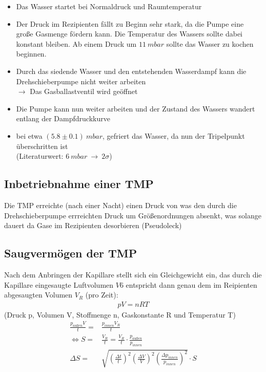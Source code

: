 \documentclass[12pt, a4paper]{scrartcl}
\begin{document}
        \begin{itemize}
            \item Das Wasser startet bei Normaldruck und Raumtemperatur
            
            \item Der Druck im Rezipienten fällt zu Beginn sehr stark, da die Pumpe eine große Gasmenge fördern kann. Die Temperatur des Wassers sollte dabei konstant bleiben. Ab einem Druck um $11\ mbar$ sollte das Wasser zu kochen beginnen.
            
            \item Durch das siedende Wasser und den entstehenden Wasserdampf kann die Drehschieberpumpe nicht weiter arbeiten\\
            $\rightarrow$ Das Gasballastventil wird geöffnet
            
            \item Die Pumpe kann nun weiter arbeiten und der Zustand des Wassers wandert entlang der Dampfdruckkurve
            
            \item bei etwa $(5.8\pm0.1)\ mbar$, gefriert das Wasser, da nun der Tripelpunkt überschritten ist\\(Literaturwert: $6\ mbar\ \rightarrow\ 2\sigma$)
        \end{itemize}

    \subsection{Inbetriebnahme einer TMP}
    
        Die TMP erreichte (nach einer Nacht) einen Druck von 
        was den durch die Drehschieberpumpe errreichten Druck um 
        Größenordnungen absenkt, was solange dauert da Gase im Rezipienten desorbieren (Pseudoleck)
        
    \subsection{Saugvermögen der TMP}
        
        Nach dem Anbringen der Kapillare stellt sich ein Gleichgewicht ein, das durch die Kapillare eingesaugte Luftvolumen $V6$ entspricht dann genau dem im Reipienten abgesaugten Volumen $V_R$ (pro Zeit):
        \begin{align}
            pV=nRT
        \end{align}
        (Druck p, Volumen V, Stoffmenge n, Gaskonstante R und Temperatur T)
        \begin{align}
            \frac{p_{außen}V}{t} =& \frac{p_{innen}V_R}{t}\\
            \Leftrightarrow S=&\frac{V_R}{t}=\frac{V_R}{t}\cdot \frac{p_{außen}}{p_{innen}}\\
            \Delta S=&\sqrt{
                (\frac{\Delta t}t)^2
                (\frac{\Delta V}V)^2
                (\frac{\Delta p_{innen}}{p_{innen}})^2
            }\cdot S
        \end{align}
	
\end{document}

